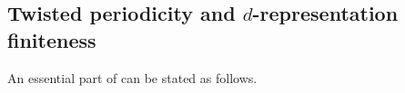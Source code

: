 \documentclass[a4paper,reqno,11pt]{amsart}
\theoremstyle{definition}
\newcommand{\new}[1]{{\blue #1}}
\numberwithin{equation}{section}
\begin{document}

\subsection{\new{Twisted periodicity and $d$-representation finiteness}}


An essential part of \cite[2.9]{DI} can be stated as follows.
\end{document}
